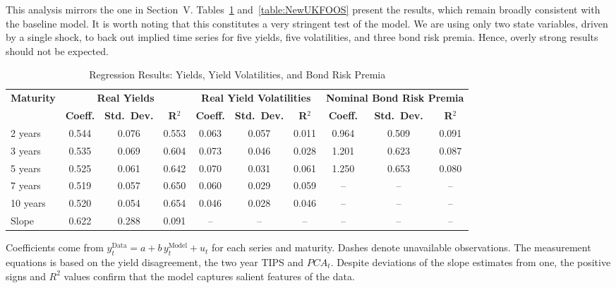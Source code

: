 This analysis mirrors the one in Section~V. Tables~\ref{table:AltUKFOOS} and~\ref{table:NewUKFOOS} present the results, which remain broadly consistent with the baseline model. It is worth noting that this constitutes a very stringent test of the model. We are using only two state variables, driven by a single shock, to back out implied time series for five yields, five volatilities, and three bond risk premia. Hence, overly strong results should not be expected.


\begin{landscape}
\begin{table}[H]
    \centering
    \begin{tabular}{lccccccccc}
        \toprule
        \multirow{2}{*}{\textbf{Maturity}} &
            \multicolumn{3}{c}{\textbf{Real Yields}} &
            \multicolumn{3}{c}{\textbf{Real Yield Volatilities}} &
            \multicolumn{3}{c}{\textbf{Nominal Bond Risk Premia}} \\
        \cmidrule(lr){2-4}\cmidrule(lr){5-7}\cmidrule(lr){8-10}
        & \textbf{Coeff.} & \textbf{Std.\ Dev.} & \textbf{R$^2$} 
        & \textbf{Coeff.} & \textbf{Std.\ Dev.} & \textbf{R$^2$} 
        & \textbf{Coeff.} & \textbf{Std.\ Dev.} & \textbf{R$^2$} \\
        \midrule
        2 years  & 0.544 & 0.076 & 0.553 & 0.063 & 0.057 & 0.011 & 0.964 & 0.509 & 0.091 \\
        3 years  & 0.535 & 0.069 & 0.604 & 0.073 & 0.046 & 0.028 & 1.201 & 0.623 & 0.087 \\
        5 years  & 0.525 & 0.061 & 0.642 & 0.070 & 0.031 & 0.061 & 1.250 & 0.653 & 0.080 \\
        7 years  & 0.519 & 0.057 & 0.650 & 0.060 & 0.029 & 0.059 & --    & --    & --    \\
        10 years & 0.520 & 0.054 & 0.654 & 0.046 & 0.028 & 0.046 & --    & --    & --    \\
        Slope    & 0.622 & 0.288 & 0.091 & --    & --    & --    & --    & --    & --    \\
        \bottomrule
    \end{tabular}
    \vspace{0.5em}
    \caption{Regression Results: Yields, Yield Volatilities, and Bond Risk Premia}
    \label{table:AltUKFOOS}
    \begin{minipage}{0.95\textwidth}
        \footnotesize
        Coefficients come from $y^{\text{Data}}_t = a + b\,y^{\text{Model}}_t + u_t$ for each series and maturity.
        Dashes denote unavailable observations. The measurement equations is based on the yield disagreement, the two year TIPS and $PCA_t$. Despite deviations of the slope estimates from one, the positive signs and
        $R^2$ values confirm that the model captures salient features of the data.
    \end{minipage}
\end{table}
\end{landscape}

